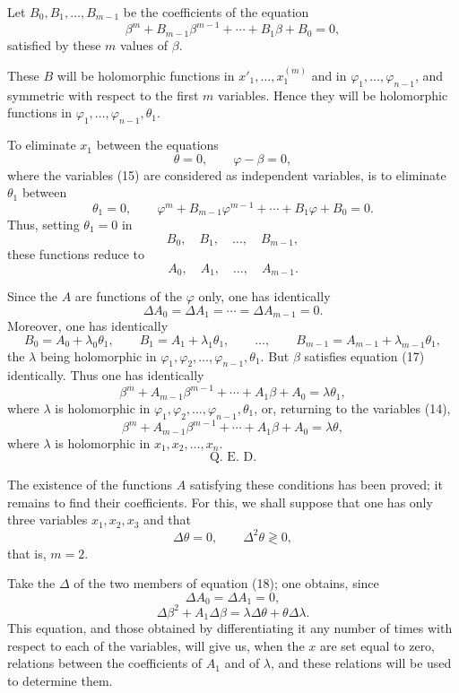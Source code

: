 \documentclass[11pt]{article}
\begin{document}
Let $B_0,B_1,\ldots,B_{m-1}$ be the coefficients of the equation
\begin{equation*}\tag{17}
\beta^m+B_{m-1}\beta^{m-1}+\cdots+B_1\beta+B_0=0,
\end{equation*}
satisfied by these $m$ values of $\beta$.

These $B$ will be holomorphic functions in $x'_1,\ldots,x_1^{(m)}$ and in $\varphi_1,\ldots,\varphi_{n-1}$, and symmetric with respect to the first $m$ variables. Hence they will be holomorphic functions in $\varphi_1,\ldots,\varphi_{n-1},\theta_1$.

To eliminate $x_1$ between the equations
\[
\theta=0,\qquad \varphi-\beta=0,
\]
where the variables (15) are considered as independent variables, is to eliminate $\theta_1$ between
\[
\theta_1=0,
\qquad
\varphi^m+B_{m-1}\varphi^{m-1}+\cdots+B_1\varphi+B_0=0.
\]
Thus, setting $\theta_1=0$ in
\[
B_0,\quad B_1,\quad \ldots,\quad B_{m-1},
\]
these functions reduce to
\[
A_0,\quad A_1,\quad \ldots,\quad A_{m-1}.
\]

Since the $A$ are functions of the $\varphi$ only, one has identically
\[
\Delta A_0=\Delta A_1=\cdots=\Delta A_{m-1}=0.
\]
Moreover, one has identically
\[
B_0=A_0+\lambda_0\theta_1,\qquad
B_1=A_1+\lambda_1\theta_1,\qquad
\ldots,\qquad
B_{m-1}=A_{m-1}+\lambda_{m-1}\theta_1,
\]
the $\lambda$ being holomorphic in $\varphi_1,\varphi_2,\ldots,\varphi_{n-1},\theta_1$. But $\beta$ satisfies equation (17) identically. Thus one has identically
\[
\beta^m+A_{m-1}\beta^{m-1}+\cdots+A_1\beta+A_0=\lambda\theta_1,
\]
where $\lambda$ is holomorphic in $\varphi_1,\varphi_2,\ldots,\varphi_{n-1},\theta_1$, or, returning to the variables (14),
\begin{equation*}\tag{18}
\beta^m+A_{m-1}\beta^{m-1}+\cdots+A_1\beta+A_0=\lambda\theta,
\end{equation*}
where $\lambda$ is holomorphic in $x_1,x_2,\ldots,x_n$.
\[
\text{Q. E. D.}
\]

The existence of the functions $A$ satisfying these conditions has been proved; it remains to find their coefficients. For this, we shall suppose that one has only three variables $x_1,x_2,x_3$ and that
\[
\Delta\theta=0,\qquad \Delta^2\theta\gtrless0,
\]
that is, $m=2$.

Take the $\Delta$ of the two members of equation (18); one obtains, since
\[
\Delta A_0=\Delta A_1=0,
\]
\begin{equation*}\tag{19}
\Delta\beta^2+A_1\Delta\beta=\lambda\Delta\theta+\theta\Delta\lambda.
\end{equation*}
This equation, and those obtained by differentiating it any number of times with respect to each of the variables, will give us, when the $x$ are set equal to zero, relations between the coefficients of $A_1$ and of $\lambda$, and these relations will be used to determine them.
\end{document}
